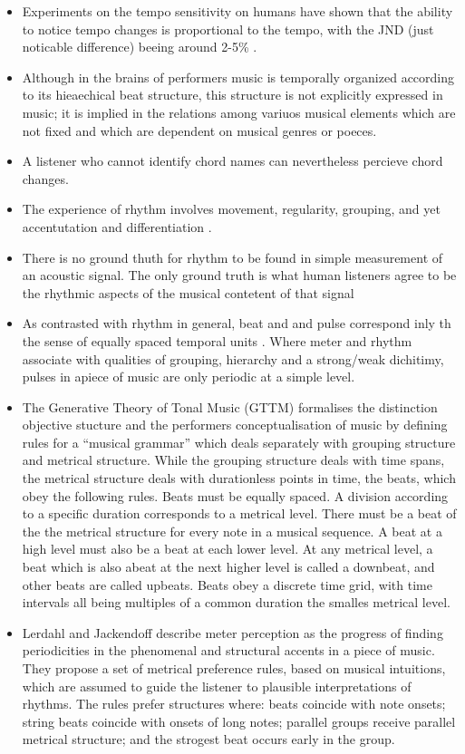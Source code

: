 \documentclass{scrartcl}
\begin{document}
\begin{itemize}
\item Experiments on the tempo sensitivity on humans have shown that the ability to notice tempo changes is proportional to the tempo, with the JND (just noticable difference) beeing around 2-5\% \cite{Drake1993}.
\item Although in the brains of performers music is temporally organized according to its hieaechical beat structure, this structure is not explicitly expressed in music; it is implied in the relations among variuos musical elements which are not fixed and which are dependent on musical genres or poeces.
\item A listener who cannot identify chord names can nevertheless percieve chord changes.
\item The experience of rhythm involves movement, regularity, grouping, and yet accentutation and differentiation \cite{Handel1989}.
\item There is no ground thuth for rhythm to be found in simple measurement of an acoustic signal. The only ground truth is what human listeners agree to be the rhythmic aspects of the musical contetent of that signal
\item As contrasted with rhythm in general, beat and and pulse correspond inly th the sense of equally spaced temporal units \cite{Handel1989}. Where meter and rhythm associate with qualities of grouping, hierarchy and a strong/weak dichitimy, pulses in apiece of music are only periodic at a simple level.
\item The Generative Theory of Tonal Music (GTTM) \cite{Lerdahl1985} formalises the distinction objective stucture and the performers conceptualisation of music by defining rules for a ``musical grammar'' which deals separately with grouping structure and metrical structure. While the grouping structure deals with time spans, the metrical structure deals with durationless points in time, the beats, which obey the following rules. Beats must be equally spaced. A division according to a specific duration corresponds to a metrical level. There must be a beat of the the metrical structure for every note in a musical sequence. A beat at a high level must also be a beat at each lower level. At any metrical level, a beat which is also abeat at the next higher level is called a downbeat, and other beats are called upbeats. Beats obey a discrete time grid, with time intervals all being multiples of a common duration the smalles metrical level. 
\item Lerdahl and Jackendoff \cite{Lerdahl1985} describe meter perception as the progress of finding periodicities in the phenomenal and structural accents in a piece of music. They propose a set of metrical preference rules, based on musical intuitions, which are assumed to guide the listener to plausible interpretations of rhythms. The rules prefer structures where: beats coincide with note onsets; string beats coincide with onsets of long notes; parallel groups receive parallel metrical structure; and the strogest beat occurs early in the group.

\end{itemize}
\end{document}
